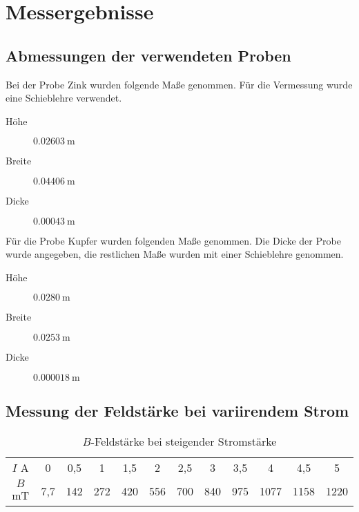 \section{Messergebnisse}

\subsection{Abmessungen der verwendeten Proben}

Bei der Probe Zink wurden folgende Maße genommen.
Für die Vermessung wurde eine Schieblehre verwendet.

\begin{description}
  \item[Höhe] $\SI{0,02603}{\meter}$
  \item[Breite] $\SI{0,04406}{\meter}$
  \item[Dicke] $\SI{0,00043}{\meter}$
\end{description}

Für die Probe Kupfer wurden folgenden Maße genommen.
Die Dicke der Probe wurde angegeben, die restlichen Maße wurden mit einer
Schieblehre genommen.

\begin{description}
  \item[Höhe] $\SI{0,0280}{\meter}$
  \item[Breite] $\SI{0,0253}{\meter}$
  \item[Dicke] $\SI{0,000018}{\meter}$
\end{description}

\subsection{Messung der Feldstärke bei variirendem Strom}

\begin{table}
 \centering
 \label{tab:Messergebnisse_Feldstärke_Isteigt}
 \begin{tabular}[width=\textwidth]{S| S[table-format=1.1] S[table-format=3.1] S[table-format=3.0] S[table-format=3.1] S[table-format=3.0] S[table-format=3.1] S[table-format=3.0] S[table-format=3.1] S[table-format=4.0] S[table-format=4.1] S[table-format=4.0]}
     \midrule
      $I$  \si{\ampere} & 0 & 0,5 & 1 & 1,5 & 2 & 2,5 & 3 & 3,5 & 4 & 4,5 & 5 \\
      $B$  \si{\milli\tesla} & 7,7 & 142 & 272 & 420 & 556 & 700 & 840 & 975 & 1077 & 1158 & 1220 \\
      \bottomrule
\end{tabular}
  \caption{$B$-Feldstärke bei steigender Stromstärke}
\end{table}


